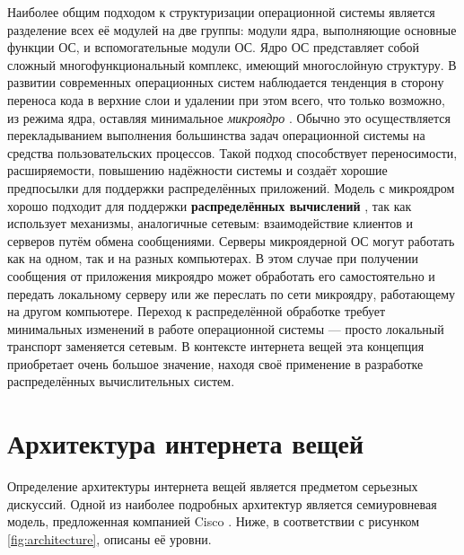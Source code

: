 Наиболее общим подходом к структуризации операционной системы является разделение всех её модулей на две группы: модули ядра, выполняющие основные функции ОС, и вспомогательные модули ОС. Ядро ОС \cite{Olifer} представляет собой сложный многофункциональный комплекс, имеющий многослойную структуру. В развитии современных операционных систем наблюдается тенденция в сторону переноса кода в верхние слои и удалении при этом всего, что только возможно, из режима ядра, оставляя минимальное \textit{микроядро} \cite{Tanenbaum}. Обычно это осуществляется перекладыванием выполнения большинства задач операционной системы на средства пользовательских процессов. Такой подход способствует переносимости, расширяемости, повышению надёжности системы и создаёт хорошие предпосылки для поддержки распределённых приложений. Модель с микроядром хорошо подходит для поддержки \textbf{распределённых вычислений} \cite{Olifer}, так как использует механизмы, аналогичные сетевым: взаимодействие клиентов и серверов путём обмена сообщениями. Серверы микроядерной ОС могут работать как на одном, так и на разных компьютерах. В этом случае при получении сообщения от приложения микроядро может обработать его самостоятельно и передать локальному серверу или же переслать по сети микроядру, работающему на другом компьютере. Переход к распределённой обработке требует минимальных изменений в работе операционной системы --- просто локальный транспорт заменяется сетевым. В контексте интернета вещей эта концепция приобретает очень большое значение, находя своё применение в разработке распределённых вычислительных систем.



\section{Архитектура интернета вещей} 

Определение архитектуры интернета вещей является предметом серьезных дискуссий. 
Одной из наиболее подробных архитектур является семиуровневая модель, предложенная компанией Cisco \cite{Cisco}. Ниже, в соответствии с рисунком \ref{fig:architecture}, описаны её уровни. \cite{Cisco_architecture_big} \cite{Cisco_architecture_small}

